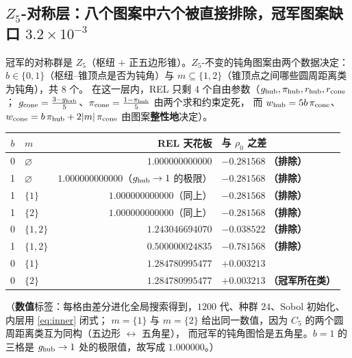 \documentclass[UTF8,11pt]{ctexart}
\theoremstyle{definition}
\begin{document}
\subsection{$Z_5$-对称层：八个图案中六个被直接排除，冠军图案缺口 $3.2\times10^{-3}$}\label{sec:symlayer}

冠军的对称群是 $Z_5$（枢纽 $+$ 正五边形锥）。$Z_5$-不变的钝角图案由两个数据决定：
$b\in\{0,1\}$（枢纽--锥顶点是否为钝角）与 $m\subseteq\{1,2\}$（锥顶点之间哪些圆周距离类为钝角），共 $8$ 个。
在这一层内，REL 只剩 $4$ 个自由参数（$g_{\rm hub},\pi_{\rm hub},r_{\rm hub},r_{\rm cone}$；
$g_{\rm cone}=\frac{3-g_{\rm hub}}5$、$\pi_{\rm cone}=\frac{1-\pi_{\rm hub}}5$ 由两个求和约束定死，
而 $w_{\rm hub}=5b\,\pi_{\rm cone}$、$w_{\rm cone}=b\,\pi_{\rm hub}+2|m|\,\pi_{\rm cone}$ 由图案\textbf{整性地}决定）。

\begin{center}\small
\begin{tabular}{clrl}
\toprule
$b$ & $m$ & REL 天花板 & 与 $\rho_0$ 之差\\
\midrule
0 & $\varnothing$ & $1.000000000000$ & $-0.281568$ \textbf{（排除）}\\
1 & $\varnothing$ & $1.000000000000$（$g_{\rm hub}\to1$ 的极限） & $-0.281568$ \textbf{（排除）}\\
1 & $\{1\}$ & $1.000000000000$（同上） & $-0.281568$ \textbf{（排除）}\\
1 & $\{2\}$ & $1.000000000000$（同上） & $-0.281568$ \textbf{（排除）}\\
0 & $\{1,2\}$ & $1.243046694070$ & $-0.038522$ \textbf{（排除）}\\
1 & $\{1,2\}$ & $0.500000024835$ & $-0.781568$ \textbf{（排除）}\\
0 & $\{1\}$ & $1.284780995477$ & $+0.003213$\\
0 & $\{2\}$ & $1.284780995477$ & $+0.003213$ \textbf{（冠军所在类）}\\
\bottomrule
\end{tabular}
\end{center}

（\textbf{数值}标签：每格由差分进化全局搜索得到，$1200$ 代、种群 $24$、Sobol 初始化、内层用 \eqref{eq:inner} 闭式；
$m=\{1\}$ 与 $m=\{2\}$ 给出同一数值，因为 $C_5$ 的两个圆周距离类互为同构（五边形 $\leftrightarrow$ 五角星），
而冠军的钝角图恰是五角星。$b=1$ 的三格是 $g_{\rm hub}\to1$ 处的极限值，故写成 $1.000000$。）
\end{document}
